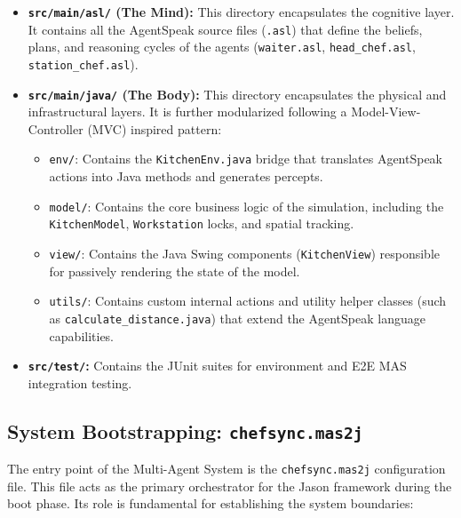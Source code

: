 \documentclass{scrartcl}
\begin{document}
\begin{itemize}
\item \textbf{\texttt{src/main/asl/} (The Mind):} This directory encapsulates the cognitive layer. It contains all the AgentSpeak source files (\texttt{.asl}) that define the beliefs, plans, and reasoning cycles of the agents (\texttt{waiter.asl}, \texttt{head\_chef.asl}, \texttt{station\_chef.asl}).

\item \textbf{\texttt{src/main/java/} (The Body):} This directory encapsulates the physical and infrastructural layers. It is further modularized following a Model-View-Controller (MVC) inspired pattern:
\begin{itemize}
  \item \texttt{env/}: Contains the \texttt{KitchenEnv.java} bridge that translates AgentSpeak actions into Java methods and generates percepts.
  \item \texttt{model/}: Contains the core business logic of the simulation, including the \texttt{KitchenModel}, \texttt{Workstation} locks, and spatial tracking.
  \item \texttt{view/}: Contains the Java Swing components (\texttt{KitchenView}) responsible for passively rendering the state of the model.
  \item \texttt{utils/}: Contains custom internal actions and utility helper classes (such as \texttt{calculate\_distance.java}) that extend the AgentSpeak language capabilities.
\end{itemize}

\item \textbf{\texttt{src/test/}:} Contains the JUnit suites for environment and E2E MAS integration testing.
\end{itemize}


\subsection{System Bootstrapping: \texttt{chefsync.mas2j}}

The entry point of the Multi-Agent System is the \texttt{chefsync.mas2j} configuration file. This file acts as the primary orchestrator for the Jason framework during the boot phase. Its role is fundamental for establishing the system boundaries:
\end{document}
